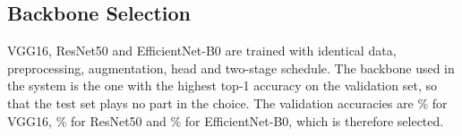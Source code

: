 \documentclass[conference]{IEEEtran}
\begin{document}
\begin{table}[!htb]
\centering
\caption{Training hyperparameters (identical for all backbones)}
\label{tab:hyper}
\end{table}

\subsection{Backbone Selection}
VGG16, ResNet50 and EfficientNet-B0 are trained with identical data,
preprocessing, augmentation, head and two-stage schedule. The backbone used in
the system is the one with the highest top-1 accuracy on the validation set, so
that the test set plays no part in the choice. The validation accuracies are
\VggVal\% for VGG16, \ResNetVal\% for ResNet50 and \EffNetVal\% for
EfficientNet-B0, which is therefore selected.
\end{document}
